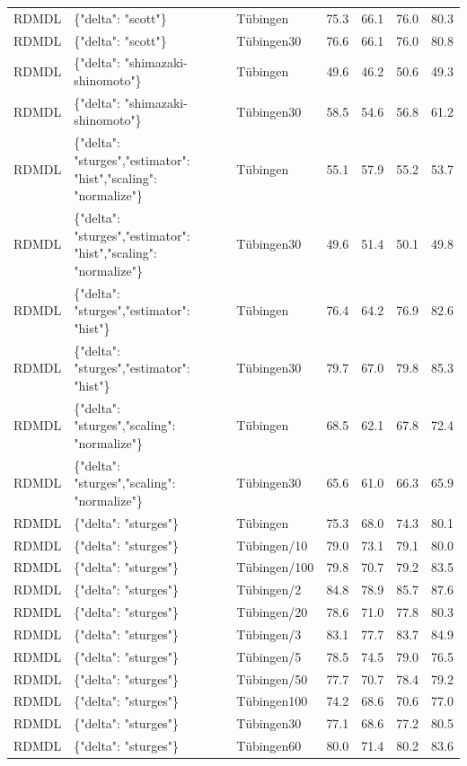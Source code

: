 \begin{tabular}{lllllll}
RDMDL & \{"delta": "scott"\} & Tübingen & 75.3 & 66.1 & 76.0 & 80.3 \\
RDMDL & \{"delta": "scott"\} & Tübingen30 & 76.6 & 66.1 & 76.0 & 80.8 \\
RDMDL & \{"delta": "shimazaki-shinomoto"\} & Tübingen & 49.6 & 46.2 & 50.6 & 49.3 \\
RDMDL & \{"delta": "shimazaki-shinomoto"\} & Tübingen30 & 58.5 & 54.6 & 56.8 & 61.2 \\
RDMDL & \{"delta": "sturges","estimator": "hist","scaling": "normalize"\} & Tübingen & 55.1 & 57.9 & 55.2 & 53.7 \\
RDMDL & \{"delta": "sturges","estimator": "hist","scaling": "normalize"\} & Tübingen30 & 49.6 & 51.4 & 50.1 & 49.8 \\
RDMDL & \{"delta": "sturges","estimator": "hist"\} & Tübingen & 76.4 & 64.2 & 76.9 & 82.6 \\
RDMDL & \{"delta": "sturges","estimator": "hist"\} & Tübingen30 & 79.7 & 67.0 & 79.8 & 85.3 \\
RDMDL & \{"delta": "sturges","scaling": "normalize"\} & Tübingen & 68.5 & 62.1 & 67.8 & 72.4 \\
RDMDL & \{"delta": "sturges","scaling": "normalize"\} & Tübingen30 & 65.6 & 61.0 & 66.3 & 65.9 \\
RDMDL & \{"delta": "sturges"\} & Tübingen & 75.3 & 68.0 & 74.3 & 80.1 \\
RDMDL & \{"delta": "sturges"\} & Tübingen/10 & 79.0 & 73.1 & 79.1 & 80.0 \\
RDMDL & \{"delta": "sturges"\} & Tübingen/100 & 79.8 & 70.7 & 79.2 & 83.5 \\
RDMDL & \{"delta": "sturges"\} & Tübingen/2 & 84.8 & 78.9 & 85.7 & 87.6 \\
RDMDL & \{"delta": "sturges"\} & Tübingen/20 & 78.6 & 71.0 & 77.8 & 80.3 \\
RDMDL & \{"delta": "sturges"\} & Tübingen/3 & 83.1 & 77.7 & 83.7 & 84.9 \\
RDMDL & \{"delta": "sturges"\} & Tübingen/5 & 78.5 & 74.5 & 79.0 & 76.5 \\
RDMDL & \{"delta": "sturges"\} & Tübingen/50 & 77.7 & 70.7 & 78.4 & 79.2 \\
RDMDL & \{"delta": "sturges"\} & Tübingen100 & 74.2 & 68.6 & 70.6 & 77.0 \\
RDMDL & \{"delta": "sturges"\} & Tübingen30 & 77.1 & 68.6 & 77.2 & 80.5 \\
RDMDL & \{"delta": "sturges"\} & Tübingen60 & 80.0 & 71.4 & 80.2 & 83.6 \\

\end{tabular}
